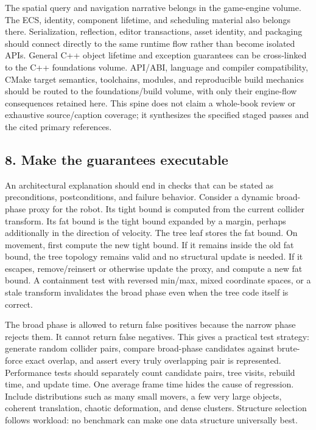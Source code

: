 The spatial query and navigation narrative belongs in the game-engine volume. The ECS, identity, component lifetime, and scheduling material also belongs there. Serialization, reflection, editor transactions, asset identity, and packaging should connect directly to the same runtime flow rather than become isolated APIs. General C++ object lifetime and exception guarantees can be cross-linked to the C++ foundations volume. API/ABI, language and compiler compatibility, CMake target semantics, toolchains, modules, and reproducible build mechanics should be routed to the foundations/build volume, with only their engine-flow consequences retained here. This spine does not claim a whole-book review or exhaustive source/caption coverage; it synthesizes the specified staged passes and the cited primary references.

\subsection{8. Make the guarantees executable}\label{05-engine-i-ch008-make-the-guarantees-executable}

An architectural explanation should end in checks that can be stated as preconditions, postconditions, and failure behavior. Consider a dynamic broad-phase proxy for the robot. Its tight bound is computed from the current collider transform. Its fat bound is the tight bound expanded by a margin, perhaps additionally in the direction of velocity. The tree leaf stores the fat bound. On movement, first compute the new tight bound. If it remains inside the old fat bound, the tree topology remains valid and no structural update is needed. If it escapes, remove/reinsert or otherwise update the proxy, and compute a new fat bound. A containment test with reversed min/max, mixed coordinate spaces, or a stale transform invalidates the broad phase even when the tree code itself is correct.

The broad phase is allowed to return false positives because the narrow phase rejects them. It cannot return false negatives. This gives a practical test strategy: generate random collider pairs, compare broad-phase candidates against brute-force exact overlap, and assert every truly overlapping pair is represented. Performance tests should separately count candidate pairs, tree visits, rebuild time, and update time. One average frame time hides the cause of regression. Include distributions such as many small movers, a few very large objects, coherent translation, chaotic deformation, and dense clusters. Structure selection follows workload: no benchmark can make one data structure universally best.

